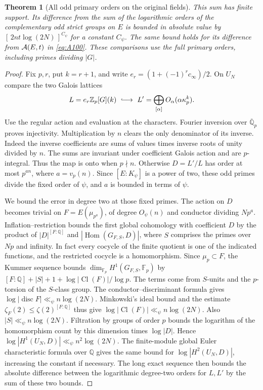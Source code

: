 \documentclass[a4paper,11pt]{article}
\newtheorem{theorem}[proposition]{Theorem}
\theoremstyle{definition}
\theoremstyle{remark}
\numberwithin{equation}{section}
\begin{document}
\begin{theorem}[All odd primary orders on the original fields]\leavevmode
\label{thm:lattices269}
This sum has finite support. Its difference from the sum of
the logarithmic orders of the complementary odd strict
groups on \(E\) is bounded in absolute value by
\([\,2nt\log(2N)\,]^{C_\psi}\) for a constant \(C_\psi\).
The same bound holds for its difference from
\({\cal A}(E,t)\) in \eqref{eq:A100}. These comparisons use
the full primary orders, including primes dividing \(|G|\).
\end{theorem}
\begin{proof}
Fix \(p,r\), put \(k=r+1\), and write
\(e_r=(1+(-1)^r c_\infty)/2\). On \(U_N\) compare the two
Galois lattices
\[
 L=e_r\mathbb Z_p[G](k)\ \lhook\joinrel\longrightarrow\
 L'=\bigoplus_{[\alpha]}O_\alpha(\alpha\kappa_p^k).
\]
Use the regular action and evaluation at the characters.
Fourier inversion over \(\overline{\mathbb Q}_p\) proves
injectivity. Multiplication by \(n\) clears the only
denominator of its inverse. Indeed the inverse coefficients
are sums of values times inverse roots of unity divided by
\(n\). The sums are invariant under coefficient Galois action
and are \(p\)-integral. Thus the map is onto when \(p\nmid n\).
Otherwise \(D=L'/L\) has order at most \(p^{an}\), where
\(a=v_p(n)\). Since \([E:K_\psi]\) is a power of two, these
odd primes divide the fixed order of \(\psi\), and \(a\) is
bounded in terms of \(\psi\).

We bound the error in degree two at those fixed primes.
The action on \(D\) becomes trivial on
\(F=E(\mu_{p^a})\), of degree \(O_\psi(n)\) and conductor
dividing \(Np^a\). Inflation--restriction bounds the first
global cohomology with coefficient \(D\) by the product of
\(|D|^{[F:\mathbb Q]}\) and
\(|\operatorname{Hom}(G_{F,S},D)|\), where \(S\) comprises
the primes over \(Np\) and infinity. In fact every cocycle
of the finite quotient is one of the indicated functions,
and the restricted cocycle is a homomorphism. Since
\(\mu_p\subset F\), the Kummer sequence bounds
\(\dim_{\mathbb F_p}H^1(G_{F,S},\mathbb F_p)\) by
\([F:\mathbb Q]+|S|+1+\log|\operatorname{Cl}(F)|/\log p\).
The terms come from \(S\)-units and the \(p\)-torsion of the
\(S\)-class group. The conductor--discriminant formula gives
\(\log|\operatorname{disc}F|\ll_\psi n\log(2N)\).
Minkowski's ideal bound and the estimate
\(\zeta_F(2)\le\zeta(2)^{[F:\mathbb Q]}\) thus give
\(\log|\operatorname{Cl}(F)|\ll_\psi n\log(2N)\).
Also \(|S|\ll_\psi n\log(2N)\). Filtration by groups of order
\(p\) bounds the logarithm of the homomorphism count by this
dimension times \(\log|D|\). Hence
\(\log|H^1(U_N,D)|\ll_\psi n^2\log(2N)\).
The finite-module global Euler characteristic formula over
\(\mathbb Q\) gives the same bound for
\(\log|H^2(U_N,D)|\), increasing the constant if necessary.
The long exact sequence then bounds the absolute difference
between the logarithmic degree-two orders for \(L,L'\) by
the sum of these two bounds.


\end{proof}
\end{document}
